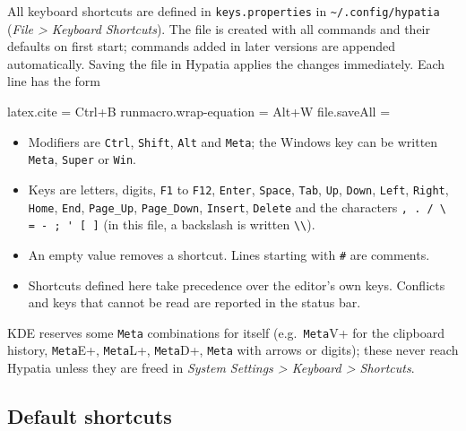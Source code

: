 \documentclass[11pt]{article}
\newcommand{\menu}[1]{\textsf{\textit{#1}}}
\newcommand{\file}[1]{\texttt{#1}}
\newcommand{\cfgdir}{\texttt{\textasciitilde/.config/hypatia}}
\begin{document}
    All keyboard shortcuts are defined in \file{keys.properties} in \cfgdir{} (\menu{File > Keyboard Shortcuts}). The file is created with all commands and their defaults on first start; commands added in later versions are appended automatically. Saving the file in Hypatia applies the changes immediately. Each line has the form
    \begin{Code}
latex.cite = Ctrl+B
runmacro.wrap-equation = Alt+W
file.saveAll =
    \end{Code}
    \begin{itemize}
        \itemsep-1mm
        \item Modifiers are \verb+Ctrl+, \verb+Shift+, \verb+Alt+ and \verb+Meta+; the Windows key can be written \verb+Meta+, \verb+Super+ or \verb+Win+.
        \item Keys are letters, digits, \verb+F1+ to \verb+F12+, \verb+Enter+, \verb+Space+, \verb+Tab+, \verb+Up+, \verb+Down+, \verb+Left+, \verb+Right+, \verb+Home+, \verb+End+, \verb+Page_Up+, \verb+Page_Down+, \verb+Insert+, \verb+Delete+ and the characters \verb+, . / \ = - ; ' [ ]+ (in this file, a backslash is written \verb+\\+).
        \item An empty value removes a shortcut. Lines starting with \verb+#+ are comments.
        \item Shortcuts defined here take precedence over the editor's own keys. Conflicts and keys that cannot be read are reported in the status bar.
    \end{itemize}
    KDE reserves some \verb+Meta+ combinations for itself (e.g.\ \verb+Meta+V+ for the clipboard history, \verb+Meta+E+, \verb+Meta+L+, \verb+Meta+D+, \verb+Meta+ with arrows or digits); these never reach Hypatia unless they are freed in \menu{System Settings > Keyboard > Shortcuts}.

    \subsection{Default shortcuts}
\end{document}
